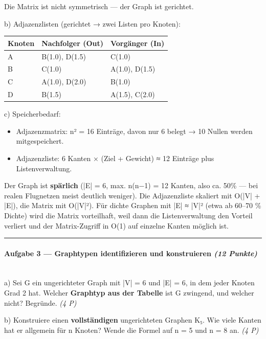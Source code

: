 \documentclass[11pt, a4paper]{article}
\begin{document}
Die Matrix ist nicht symmetrisch — der Graph ist gerichtet.


b) Adjazenzlisten (gerichtet → zwei Listen pro Knoten):



{\small
\begin{tabularx}{\linewidth}{XXX}
\hline
\rowcolor{tableheadbg}
{\color{white}\textbf{Knoten}} & {\color{white}\textbf{Nachfolger (Out)}} & {\color{white}\textbf{Vorgänger (In)}} \\[2pt]
\hline
\endhead
\hline
\endfoot
A & B(1.0), D(1.5) & C(1.0) \\
B & C(1.0) & A(1.0), D(1.5) \\
C & A(1.0), D(2.0) & B(1.0) \\
D & B(1.5) & A(1.5), C(2.0) \\
\end{tabularx}
}


c) Speicherbedarf:

\begin{itemize}
  \item Adjazenzmatrix: n² = 16 Einträge, davon nur 6 belegt → 10 Nullen werden mitgespeichert.
  \item Adjazenzliste: 6 Kanten × (Ziel + Gewicht) ≈ 12 Einträge plus Listenverwaltung.
\end{itemize}

Der Graph ist \textbf{spärlich} (|E| = 6, max. n(n−1) = 12 Kanten, also ca. 50\% — bei realen Flugnetzen meist deutlich weniger). Die Adjazenzliste skaliert mit O(|V| + |E|), die Matrix mit O(|V|²). Für dichte Graphen mit |E| ≈ |V|² (etwa ab 60–70 \% Dichte) wird die Matrix vorteilhaft, weil dann die Listenverwaltung den Vorteil verliert und der Matrix-Zugriff in O(1) auf einzelne Kanten möglich ist.



\noindent\textcolor{rulegray}{\rule{\linewidth}{0.4pt}}


\paragraph{Aufgabe 3 — Graphtypen identifizieren und konstruieren \textit{(12 Punkte)}}\mbox{}\\[2pt]

a) Sei G ein ungerichteter Graph mit |V| = 6 und |E| = 6, in dem jeder Knoten Grad 2 hat. Welcher \textbf{Graphtyp aus der Tabelle} ist G zwingend, und welcher nicht? Begründe. \textit{(4 P)}


b) Konstruiere einen \textbf{vollständigen} ungerichteten Graphen K₅. Wie viele Kanten hat er allgemein für n Knoten? Wende die Formel auf n = 5 und n = 8 an. \textit{(4 P)}
\end{document}
